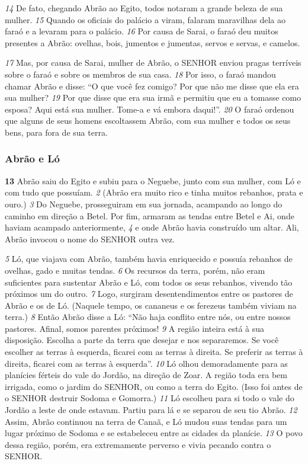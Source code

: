 \bigskip
\textit{\tiny 14}
De fato, chegando Abrão ao Egito, todos notaram a grande beleza de sua
mulher. 
\textit{\tiny 15}
Quando os oficiais do palácio a viram, falaram maravilhas dela ao faraó
e a levaram para o palácio. 
\textit{\tiny 16}
Por causa de Sarai, o faraó deu muitos presentes a
Abrão: ovelhas, bois, jumentos e jumentas, servos e servas, e camelos.

\bigskip
\textit{\tiny 17}
Mas, por causa de Sarai, mulher de Abrão, o SENHOR enviou pragas terríveis
sobre o faraó e sobre os membros de sua casa. 
\textit{\tiny 18}
Por isso, o faraó mandou chamar
Abrão e disse: “O que você fez comigo? Por que não me disse que ela era sua
mulher? 
\textit{\tiny 19}
Por que disse que era sua irmã e permitiu que eu a tomasse como
esposa? Aqui está sua mulher. Tome-a e vá embora daqui!”. 
\textit{\tiny 20}
O faraó ordenou
que alguns de seus homens escoltassem Abrão, com sua mulher e todos os seus
bens, para fora de sua terra.

\bigskip
\subsubsection*{Abrão e Ló}
\textbf{\large 13}
 Abrão saiu do Egito e subiu para o Neguebe, junto com sua mulher, com Ló
e com tudo que possuíam. 
\textit{\tiny 2}
(Abrão era muito rico e tinha muitos rebanhos, prata e
ouro.) 
\textit{\tiny 3}
Do Neguebe, prosseguiram em sua jornada, acampando ao longo do
caminho em direção a Betel. Por fim, armaram as tendas entre Betel e Ai, onde
haviam acampado anteriormente, 
\textit{\tiny 4}
e onde Abrão havia construído um altar. Ali,
Abrão invocou o nome do SENHOR outra vez.

\bigskip
\textit{\tiny 5}
Ló, que viajava com Abrão, também havia enriquecido e possuía rebanhos de
ovelhas, gado e muitas tendas. 
\textit{\tiny 6}
Os recursos da terra, porém, não eram suficientes para sustentar Abrão e Ló, com todos os seus rebanhos, vivendo tão próximos um
do outro. 
\textit{\tiny 7}
Logo, surgiram desentendimentos entre os pastores de Abrão e os de
Ló. (Naquele tempo, os cananeus e os ferezeus também viviam na terra.)
\textit{\tiny 8}
Então Abrão disse a Ló: “Não haja conflito entre nós, ou entre nossos pastores.
Afinal, somos parentes próximos! 
\textit{\tiny 9}
A região inteira está à sua disposição. Escolha
a parte da terra que desejar e nos separaremos. Se você escolher as terras à
esquerda, ficarei com as terras à direita. Se preferir as terras à direita, ficarei com
as terras à esquerda”.
\textit{\tiny 10}
Ló olhou demoradamente para as planícies férteis do vale do Jordão, na
direção de Zoar. A região toda era bem irrigada, como o jardim do SENHOR, ou
como a terra do Egito. (Isso foi antes de o SENHOR destruir Sodoma e Gomorra.)
\textit{\tiny 11}
Ló escolheu para si todo o vale do Jordão a leste de onde estavam. Partiu para lá
e se separou de seu tio Abrão. 
\textit{\tiny 12}
Assim, Abrão continuou na terra de Canaã, e Ló
mudou suas tendas para um lugar próximo de Sodoma e se estabeleceu entre as
cidades da planície. 
\textit{\tiny 13}
O povo dessa região, porém, era extremamente perverso e
vivia pecando contra o SENHOR.

